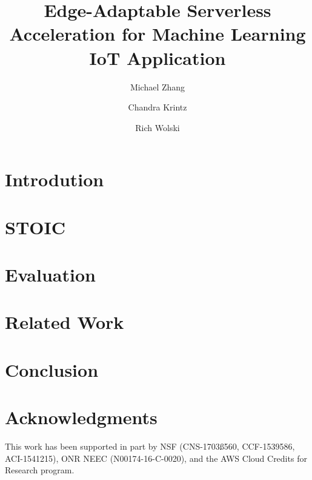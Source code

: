 \documentclass[sigplan, anonymous, authorversion]{acmart}
\begin{document}
\title{Edge-Adaptable Serverless Acceleration for Machine Learning IoT Application}
\author{Michael Zhang}
\author{Chandra Krintz}
\author{Rich Wolski}



\begin{abstract}
\label{sec:abstract}

\end{abstract}


\maketitle



\section{Introdution}
\label{sec:intro}


\section{STOIC}
\label{sec:stoic}


\section{Evaluation}
\label{sec:results}


\section{Related Work}
\label{sec:related}



\section{Conclusion}
\label{sec:conc}


\section*{Acknowledgments}
This work has been supported in part by NSF (CNS-1703ß560, CCF-1539586,
ACI-1541215), ONR NEEC (N00174-16-C-0020),
and the AWS Cloud Credits for Research program.





\end{document}
